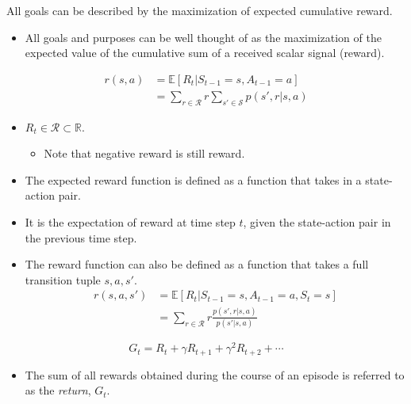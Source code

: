 \begin{definition}
	All goals can be described by the maximization of expected cumulative reward.
\end{definition}
\begin{itemize}
	\item All goals and purposes can be well thought of as the maximization of the expected value of the cumulative sum of a received scalar signal (\ie reward).
\end{itemize}

\begin{definition}
	\begin{align*}
		r(s,a)&= \mathbb{E}[R_t|S_{t-1}=s,A_{t-1}=a]\\
		&= \sum_{r\in \mathcal{R}}r\sum_{s'\in \mathcal{S}}p(s',r|s,a)
	\end{align*}
\end{definition}
\begin{itemize}
	\item $R_t\in \mathcal{R} \subset \mathbb{R}.$ 
		\begin{itemize}
			\item Note that negative reward is still reward.
		\end{itemize}
	\item The expected reward function is defined as a function that takes in a state-action pair.
	\item It is the expectation of reward at time step $t$, given the state-action pair in the previous time step.
	\item The reward function can also be defined as a function that takes a full transition tuple $s,a,s'$.
		\begin{align*}
			r(s,a,s')&= \mathbb{E}[R_t|S_{t-1}=s,A_{t-1}=a,S_{t}=s]\\
			&= \sum_{r\in \mathcal{R}}r\frac{p(s',r|s,a)}{p(s'|s,a)}
		\end{align*}
\end{itemize}

\begin{definition}
	$$G_t = R_{t}+\gamma R_{t+1}+\gamma^2 R_{t+2}+\cdots$$
\end{definition}
\begin{itemize}
	\item The sum of all rewards obtained during the course of an episode is referred to as the \textit{return}, $G_t$.
\end{itemize}


